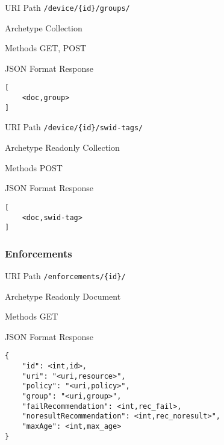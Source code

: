\documentclass[10pt,a4paper]{scrartcl}
\begin{document}
\begin{mdframed}[style=def]
\begin{description*}
	\item[URI Path] \texttt{/device/\{id\}/groups/}
	\item[Archetype] Collection 
	\item[Methods] GET, POST
	\item[JSON Format Response] \hfill
\begin{lstlisting}
[
	<doc,group>
]
\end{lstlisting}
\end{description*}
\end{mdframed}

\begin{mdframed}[style=def]
\begin{description*}
	\item[URI Path] \texttt{/device/\{id\}/swid-tags/}
	\item[Archetype] Readonly Collection 
	\item[Methods] POST
	\item[JSON Format Response] \hfill
\begin{lstlisting}
[
	<doc,swid-tag>
]
\end{lstlisting}
\end{description*}
\end{mdframed}


\pagebreak
\subsubsection{Enforcements}
\begin{mdframed}[style=def]
\begin{description*}
	\item[URI Path] \texttt{/enforcements/\{id\}/}
	\item[Archetype] Readonly Document
	\item[Methods] GET
	\item[JSON Format Response] \hfill
\begin{lstlisting}
{
	"id": <int,id>,
	"uri": "<uri,resource>",
	"policy": "<uri,policy>",
	"group": "<uri,group>",
	"failRecommendation": <int,rec_fail>,
	"noresultRecommendation": <int,rec_noresult>", 
	"maxAge": <int,max_age>
}
\end{lstlisting}
\end{description*}
\end{mdframed}
\end{document}
